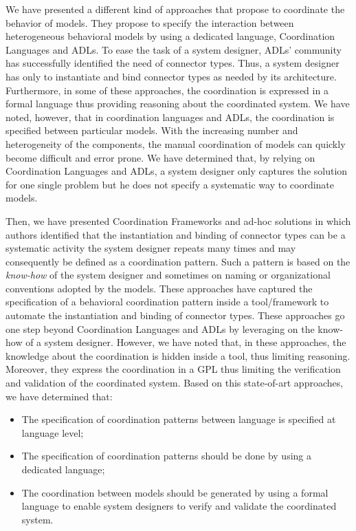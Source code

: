 We have presented a different kind of approaches that propose to coordinate the behavior of models. They propose to specify the interaction between heterogeneous behavioral models by using a dedicated language, \ie Coordination Languages and ADLs. To ease the task of a system designer, ADLs' community has successfully identified the need of connector types. Thus, a system designer has only to instantiate and bind connector types as needed by its architecture. Furthermore, in some of these approaches, the coordination is expressed in a formal language thus providing reasoning about the coordinated system. We have noted, however, that in coordination languages and ADLs, the coordination is specified between particular models. With the increasing number and heterogeneity of the components, the manual coordination of models can quickly become difficult and error prone. We have determined that, by relying on Coordination Languages and ADLs, a system designer only captures the solution for one single problem but he does not specify a systematic way to coordinate models. 
 
Then, we have presented Coordination Frameworks and ad-hoc solutions in which authors identified that the instantiation and binding of connector types can be a systematic activity the system designer repeats many times and may consequently be defined as a coordination pattern. Such a pattern is based on the \emph{know-how} of the system designer and sometimes on naming or organizational conventions adopted by the models. These approaches have captured the specification of a behavioral coordination pattern inside a tool/framework to automate the instantiation and binding of connector types. These approaches go one step beyond Coordination Languages and ADLs by leveraging on the know-how of a system designer. However, we have noted that, in these approaches, the knowledge about the coordination is hidden inside a tool, thus limiting reasoning. Moreover, they express the coordination in a GPL thus limiting the verification and validation of the coordinated system. Based on this state-of-art approaches, we have determined that:

\begin{itemize}
\item The specification of coordination patterns between language is specified at language level;
	 
\item The specification of coordination patterns should be done by using a dedicated language; 
	 
\item The coordination between models should be generated by using a formal language to enable system designers to verify and validate the coordinated system. 		
\end{itemize}

